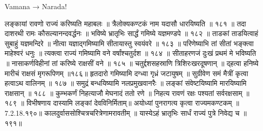 Vamana → Narada!

लङ्कायां रावणो राज्यं करिष्यति महाबलः ॥
त्रैलोक्यकण्टकं नाम यदासौ धारयिष्यति ॥ १८१ ॥
तदा दाशरथी रामः कौसल्यानन्दवर्द्धनः ॥
भविष्ये भ्रातृभिः सार्द्धं गमिष्ये यज्ञमण्डपे ॥ १८२ ॥
ताडकां ताडयित्वाहं सुबाहुं यज्ञमन्दिरे ॥
नीत्वा यज्ञाद्गमिष्यामि सीतायास्तु स्वयंवरे ॥ १८३ ॥
परिणेष्याभि तां सीतां भङ्क्त्वा माहेश्वरं धनुः ॥
त्यक्त्वा राज्यं गमिष्यामि वने वर्षांश्चतुर्दश ॥ १८४ ॥
सीताहरणजं दुःखं प्रथमं मे भविष्यति ॥
नासाकर्णविहीनां तां करिष्ये राक्षसीं वने ॥ १८५ ॥
चतुर्द्दशसहस्राणि त्रिशिरःखरदूषणान् ॥
द्हत्वा हनिष्ये मारीचं राक्षसं मृगरूपिणम् ॥१८६॥
हृतदारो गमिष्यामि दग्ध्वा गृध्रं जटायुषम् ॥
सुग्रीवेण समं मैत्रीं कृत्वा हत्वाऽथ वालिनम् ॥ १८७ ॥
समुद्रं बन्धयिष्यामि नलप्रमुखवानरैः ॥
लङ्कां संवेष्टयिष्यामि मारयिष्यामि राक्षसान् ॥ १८८ ॥
कुम्भकर्णं निहत्याजौ मेघनादं ततो रणे ॥
निहत्य रावणं रक्षः पश्यतां सर्वरक्षसाम् ॥ १८९ ॥
विभीषणाय दास्यामि लङ्कां देवविनिर्मिताम्॥
अयोध्यां पुनरागत्य कृत्वा राज्यमकण्टकम् ॥7.2.18.१९०॥
कालदुर्वाससोश्चित्रचरित्रेणामरावतीम् ॥
यास्येऽहं भ्रातृभिः सार्धं राज्यं पुत्रे निवेद्य च ॥१९१॥